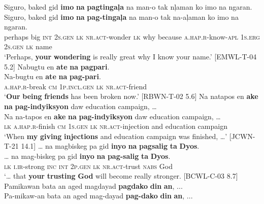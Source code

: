 \ea
\label{bkm:Ref474479194}
Siguro,  baked  gid  \textbf{imo}  \textbf{na}  \textbf{pagtingaļa}   na  man-o  tak nļaman  ko  imo  na  ngaran. \smallskip\\
\gll Siguro,  baked  gid  \textbf{imo}  \textbf{na}  \textbf{pag-tingaļa}   na  man-o  tak na-aļaman  ko  imo  na  ngaran. \\
perhaps  big  \textsc{int}  2\textsc{s.gen}  \textsc{lk}  \textsc{nr.act}-wonder  \textsc{lk}  why  because
\textsc{a.hap.r}-know-\textsc{apl}  1\textsc{s.erg}  2\textsc{s.gen}  \textsc{lk}  name \\
\glt ‘Perhaps, \textbf{your} \textbf{wondering} is really great why I know your name.’ [EMWL-T-04 5.2]
\z
\ea
Nabugtu  en  \textbf{ate}  \textbf{na}  \textbf{pagpari}. \smallskip\\
\gll Na-bugtu  en  \textbf{ate}  \textbf{na}  \textbf{pag-pari}. \\
\textsc{a.hap.r}-break  \textsc{cm}  1\textsc{p.incl.gen}  \textsc{lk}  \textsc{nr.act}-friend \\
\glt ‘\textbf{Our} \textbf{being} \textbf{friends} has been broken now.’ [RBWN-T-02 5.6]
\z
\ea
Na  natapos  en  \textbf{ake}  \textbf{na}  \textbf{pag-indyiksyon}  daw  education campaign, … \smallskip\\
\gll Na  na-tapos  en  \textbf{ake}  \textbf{na}  \textbf{pag-indyiksyon}  daw  education campaign, … \\
\textsc{lk}  \textsc{a.hap.r}-finish  \textsc{cm}  1\textsc{s.gen}  \textsc{lk}  \textsc{nr.act}-injection  and  education campaign \\
\glt ‘When \textbf{my} \textbf{giving} \textbf{injections} and education campaign was finished, …’ [JCWN-T-21 14.1]
\z
\ea
… na  magbiskeg  pa  gid  \textbf{inyo}  \textbf{na}  \textbf{pagsalig}  \textbf{ta}  \textbf{Dyos}. \smallskip\\
\gll … na  mag-biskeg  pa  gid  \textbf{inyo}  \textbf{na}  \textbf{pag-salig}  \textbf{ta}  \textbf{Dyos}. \\
{} \textsc{lk}  \textsc{i.ir}-strong  \textsc{inc}  \textsc{int}  2\textsc{p.gen}  \textsc{lk}  \textsc{nr.act}-trust  \textsc{nabs}  God \\
\glt ‘… that \textbf{your} \textbf{trusting} \textbf{God} will become really stronger. [BCWL-C-03 8.7]
\z
\ea
Pamikawan  bata  an  aged  magdayad  \textbf{pagdako}  \textbf{din}  \textbf{an}, ... \smallskip\\
\gll Pa-mikaw-an  bata  an  aged  mag-dayad  \textbf{pag-dako}  \textbf{din}  \textbf{an}, ... \\
